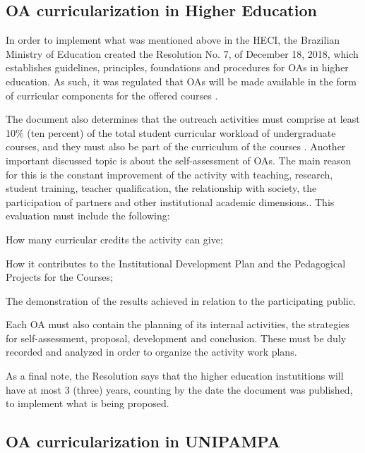 \subsection{\acl{OA} curricularization in Higher Education}\label{sec:bac-higher-ed}

In order to implement what was mentioned above in the \ac{HECI}, the Brazilian Ministry of Education created the Resolution No. 7, of December 18, 2018, which establishes guidelines, principles, foundations and procedures for \acp{OA} in higher education. As such, it was regulated that \acp{OA} will be made available in the form of curricular components for the offered courses \cite{ministerioSuperiorExtensao}.

The document also determines that the outreach activities must comprise at least 10\% (ten percent) of the total student curricular workload of undergraduate courses, and they must also be part of the curriculum of the courses \cite[p. 2, art. 4]{ministerioSuperiorExtensao}. Another important discussed topic is about the self-assessment of \acp{OA}. The main reason for this is the constant improvement of the activity with teaching, research, student training, teacher qualification, the relationship with society, the participation of partners and other institutional academic dimensions.. This evaluation must include the following:

\begin{inparaenum}[(a)]
  \item How many curricular credits the activity can give;
  \item How it contributes to the Institutional Development Plan and the Pedagogical Projects for the Courses;
  \item The demonstration of the results achieved in relation to the participating public.
\end{inparaenum}

Each \ac{OA} must also contain the planning of its internal activities, the strategies for self-assessment, proposal, development and conclusion. These must be duly recorded and analyzed in order to organize the activity work plans.

As a final note, the Resolution says that the higher education instutitions will have at most 3 (three) years, counting by the date the document was published, to implement what is being proposed.

\subsection{\acl{OA} curricularization in \acl{UNIPAMPA}}\label{sec:bac-unipampa}

